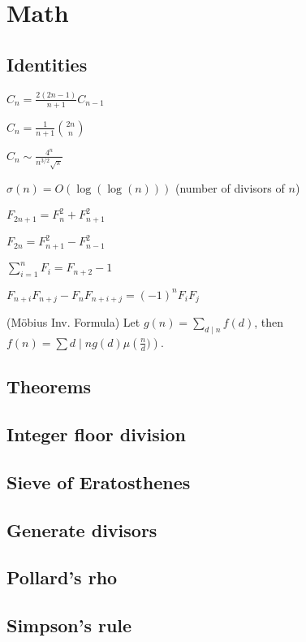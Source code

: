 \section{Math}
\subsection{Identities}
{
$C_n = \frac{2(2n-1)}{n+1} C_{n-1}$

$C_n = \frac{1}{n+1} \binom{2n}{n}$

$C_n \sim \frac{4^n}{n^{3/2}\sqrt{\pi}}$

$\sigma(n) = O(\log(\log(n)))$ (number of divisors of $n$)

$F_{2n+1} = F_{n}^2 + F_{n+1}^2$

$F_{2n} = F_{n+1}^2 - F_{n-1}^2$

$\sum_{i=1}^n F_i = F_{n+2}-1$

$F_{n+i}F_{n+j} - F_nF_{n+i+j} = (-1)^n F_iF_j$

(Möbius Inv. Formula)
Let $g(n) = \sum_{d\mid n} f(d)$, then $f(n)=\sum{d\mid n} g(d) \mu\left(\frac{n}{d})\right)$.
}
\subsection{Theorems}
\subsection{Integer floor division}
\subsection{Sieve of Eratosthenes}
\subsection{Generate divisors}
\subsection{Pollard's rho}
\subsection{Simpson's rule}
